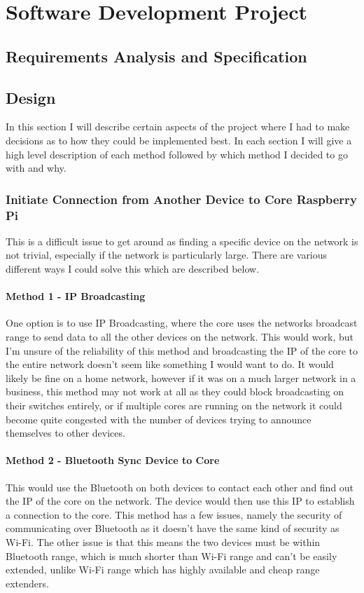 \documentclass[10pt, a4paper]{article}
\begin{document}
\newpage
\section{Software Development Project}

\subsection{Requirements Analysis and Specification}

\subsection{Design}
In this section I will describe certain aspects of the project where I had to make decisions as to how they could be implemented best. In each section I will give a high level description of each method followed by which method I decided to go with and why.

\subsubsection{Initiate Connection from Another Device to Core Raspberry Pi}
This is a difficult issue to get around as finding a specific device on the network is not trivial, especially if the network is particularly large. There are various different ways I could solve this which are described below.

\paragraph{Method 1 - IP Broadcasting} One option is to use IP Broadcasting, where the core uses the networks broadcast range to send data to all the other devices on the network. This would work, but I'm unsure of the reliability of this method and broadcasting the IP of the core to the entire network doesn't seem like something I would want to do. It would likely be fine on a home network, however if it was on a much larger network in a business, this method may not work at all as they could block broadcasting on their switches entirely, or if multiple cores are running on the network it could become quite congested with the number of devices trying to announce themselves to other devices.

\paragraph{Method 2 - Bluetooth Sync Device to Core} This would use the Bluetooth on both devices to contact each other and find out the IP of the core on the network. The device would then use this IP to establish a connection to the core. This method has a few issues, namely the security of communicating over Bluetooth as it doesn't have the same kind of security as Wi-Fi. The other issue is that this means the two devices must be within Bluetooth range, which is much shorter than Wi-Fi range and can't be easily extended, unlike Wi-Fi range which has highly available and cheap range extenders.
\end{document}
